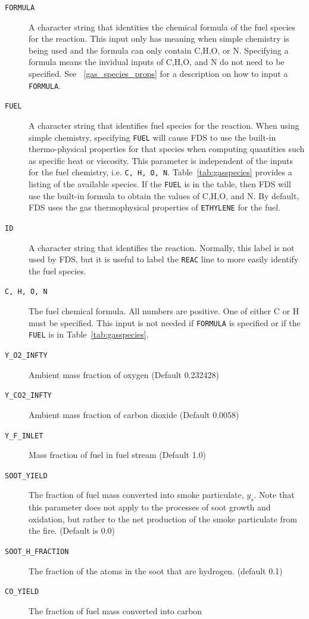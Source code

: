 \documentclass[11pt]{book}
\newcommand{\ct}{\tt\small}
\begin{document}
\begin{description}
\item[{\ct FORMULA}] A character string that identities the chemical formula of the fuel species for the reaction.  This input only has meaning when simple chemistry is being used and the formula can only contain C,H,O, or N.  Specifying a formula means the invidual inputs of C,H,O, and N do not need to be specified. See ~\ref{gas_species_props} for a description on how to input a {\ct FORMULA}.
\item[{\ct FUEL}] A character string that identifies fuel species for the reaction. When using simple chemistry, specifying {\ct FUEL} will
cause FDS to use the built-in thermo-physical properties for that species when computing quantities such as specific heat or viscosity.
This parameter is independent of the inputs for the fuel chemistry, i.e. {\ct C, H, O, N}. Table~\ref{tab:gasspecies} provides a listing of the available species.  If the {\ct FUEL} is in the table, then FDS will use the built-in formula to obtain the values of C,H,O, and N.
By default, FDS uses the gas thermophysical properties of {\ct ETHYLENE} for the fuel.
\item[{\ct ID}] A character string that identifies the reaction. Normally, this label is not used by FDS, but it is useful to
label the {\ct REAC} line to more easily identify the fuel species.
\item[{\ct C, H, O, N}] The fuel chemical formula. All numbers are positive.  One of either C or H must be specified.  This input is not needed if {\ct FORMULA} is specified or if the {\ct FUEL} is in Table~\ref{tab:gasspecies}.
\item[{\ct Y\_O2\_INFTY}] Ambient mass fraction of oxygen (Default 0.232428)
\item[{\ct Y\_CO2\_INFTY}] Ambient mass fraction of carbon dioxide (Default 0.0058)
\item[{\ct Y\_F\_INLET}] Mass fraction of fuel in fuel stream (Default 1.0)
\item[{\ct SOOT\_YIELD}] The fraction of fuel mass converted into smoke particulate, $y_s$.
Note that this parameter does not apply to the processes of soot growth and oxidation,
but rather to the net production of the smoke particulate from the fire.  (Default is 0.0)
\item[{\ct SOOT\_H\_FRACTION}] The fraction of the atoms in the soot that are hydrogen.
(default 0.1)
\item[{\ct CO\_YIELD}] The fraction of fuel mass converted into carbon

\end{description}
\end{document}
